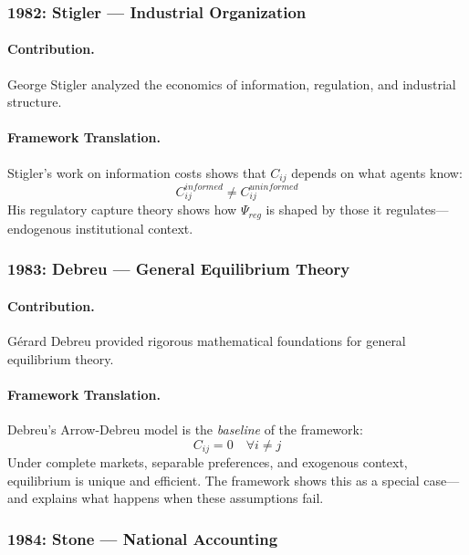 \subsubsection{1982: Stigler --- Industrial Organization}

\paragraph{Contribution.}
George Stigler analyzed the economics of information, regulation, and
industrial structure.

\paragraph{Framework Translation.}
Stigler's work on information costs shows that $C_{ij}$ depends on
what agents know:
\begin{equation}
  C_{ij}^{informed} \neq C_{ij}^{uninformed}
\end{equation}
His regulatory capture theory shows how $\Psi_{reg}$ is shaped by
those it regulates---endogenous institutional context.

\subsubsection{1983: Debreu --- General Equilibrium Theory}

\paragraph{Contribution.}
Gérard Debreu provided rigorous mathematical foundations for
general equilibrium theory.

\paragraph{Framework Translation.}
Debreu's Arrow-Debreu model is the \emph{baseline} of the framework:
\begin{equation}
  C_{ij} = 0 \quad \forall i \neq j
\end{equation}
Under complete markets, separable preferences, and exogenous context,
equilibrium is unique and efficient. The framework shows this as
a special case---and explains what happens when these assumptions fail.

\subsubsection{1984: Stone --- National Accounting}

